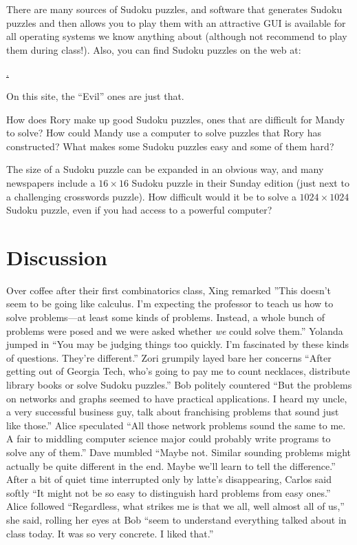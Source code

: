 \begin{example}
There are many sources of Sudoku puzzles, and software that generates
Sudoku puzzles and then allows you to play them with an attractive GUI
is available for all operating systems we know anything about (although
not recommend to play them during class!).  Also, you can find 
Sudoku puzzles on the web at:

\medskip
\begin{center}
\href{http://www.websudoku.com}.
\end{center}

\medskip
\noindent
On this site, the ``Evil'' ones are just that.

How does Rory make up good Sudoku puzzles, ones that are difficult
for Mandy to solve?  How could Mandy use
a computer to solve puzzles that Rory has constructed? 
What makes some Sudoku puzzles easy and some of them hard?

The size of a Sudoku puzzle can be expanded in an obvious
way, and many newspapers include a $16\times16$ Sudoku puzzle
in their Sunday edition (just next to a challenging crosswords puzzle).
How difficult would it be to solve a $1024\times1024$ Sudoku puzzle,
even if you had access to a powerful computer?
\end{example}

\section{Discussion}\label{s:intro:closing}

Over coffee after their first combinatorics class, Xing remarked
''This doesn't seem to be going like calculus.  I'm expecting
the professor to teach us how to solve problems---at least some
kinds of problems.  Instead, a whole bunch
of problems were posed and we were asked whether 
\textit{we} could solve them.'' Yolanda jumped in ``You may be 
judging things too quickly.  I'm fascinated by these kinds
of questions.  They're different.''  Zori grumpily layed
bare her concerns
``After getting out of Georgia Tech, who's going to pay me to
count necklaces, distribute library books or solve Sudoku puzzles.''
Bob politely countered ``But the problems on networks and graphs
seemed to have practical applications.  I heard my uncle, a very
successful business guy, talk about franchising problems that
sound just like those.''  Alice speculated ``All those network problems
sound the same to me.  A fair to middling computer science major could 
probably write programs to solve any of them.''  Dave mumbled ``Maybe not.
Similar sounding problems might actually be quite different in the end.  
Maybe we'll learn to tell the difference.'' 
After a bit of quiet time interrupted only by latte's disappearing,
Carlos said softly ``It might not be so easy to distinguish hard 
problems from easy ones.'' Alice followed ``Regardless, what strikes 
me is that we all,  well almost all of us,''
she said, rolling her eyes at Bob ``seem to understand everything talked 
about in class today.  It was so very concrete. I liked that.''

